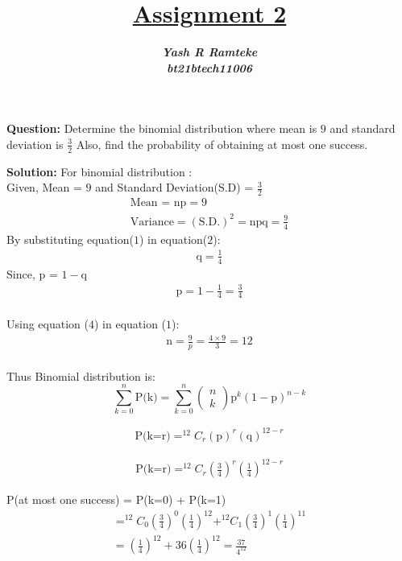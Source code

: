 \documentclass[journal,12pt,twocolumn]{IEEEtran}
\title{\textbf{\underline{Assignment 2}}}
\author{\textbf{\textit{Yash R Ramteke}}\\
\textbf{\textit{bt21btech11006}}}
\begin{document}
\maketitle

\textbf{Question:}
Determine the binomial distribution where mean is $9$ and standard deviation is $\frac{3}{2}$ Also, find the probability of obtaining at most one success.

\bigskip
\textbf{Solution:}
For binomial distribution :\\
Given, Mean = $9$ and Standard Deviation(S.D) = $\frac{3}{2}$
\begin{align}
    \text{Mean = np} = 9
    \\
    \text{Variance} = (\text{S.D.})^{2} = \text{npq} = \frac{9}{4}
\end{align}
By substituting equation($1$) in equation($2$):
\begin{align}
      \text{q} = \frac{1}{4}
\end{align}
Since, p = $1 -$q
\begin{align}
      \text{p} = 1 - \frac{1}{4} = \frac{3}{4} 
\end{align}\\
Using equation ($4$) in equation ($1$):
\begin{align}
      \text{n} = \frac{9}{p} = \frac{4\times9}{3} = 12
\end{align}\\
Thus Binomial distribution is:
\begin{equation}
     \sum_{k=0}^{n}\text{P(k)} = \sum_{k=0}^{n}\left(\begin{array}{cc}
    n\\
    k
    \end{array}\right) \text{p}^k \left(1-\text{p}\right)^{n-k}
\end{equation}


\begin{align}
\text{P(k=r)} = ^{12}C_r (\text{p})^r (\text{q})^{12-r}
\end{align}

\begin{align}
\text{P(k=r)} = ^{12}C_r \left(\frac{3}{4}\right)^r \left(\frac{1}{4}\right)^{12-r}
\end{align}

\begin{center}
\end{center}
P(at most one success) = P(k=0) + P(k=1)
\begin{align}
= ^{12}C_0 \left({\frac{3}{4}}\right)^0 \left(\frac{1}{4}\right)^{12} + ^{12}C_1 \left(\frac{3}{4}\right)^1 \left(\frac{1}{4}\right)^{11} 
\\
= \left(\frac{1}{4}\right)^{12} + 36\left(\frac{1}{4}\right)^{12} =  \frac{37}{4^{12}}
\end{align}
\end{document}
